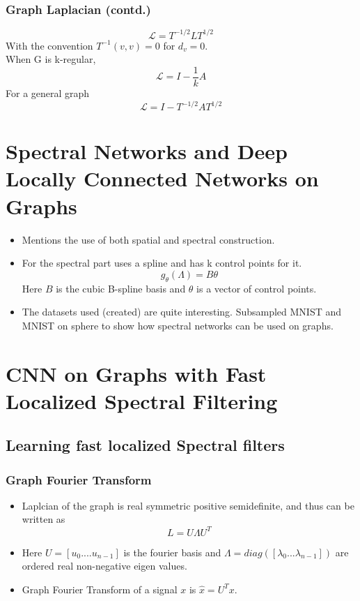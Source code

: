 \documentclass{beamer}
\begin{document}
\begin{frame}
  \frametitle{Graph Laplacian (contd.)}
  $$\mathcal{L} = T^{-1/2}LT^{1/2}$$
  With the convention $T^{-1}(v,v) = 0$ for $d_v = 0$.\\
  When G is k-regular,
  $$\mathcal{L} = I - \frac{1}{k}A$$
  For a general graph
  $$\mathcal{L} = I - T^{-1/2}AT^{1/2}$$
\end{frame}
\section{Spectral Networks and Deep Locally Connected Networks on Graphs}
\begin{frame}
  \begin{itemize}
  \item Mentions the use of both spatial and spectral construction.
  \item For the spectral part uses a spline and has k control points for it.
    $$g_{\theta}(\Lambda) = B\theta$$
    Here $B$ is the cubic B-spline basis and $\theta$ is a vector of control points.
  \item The datasets used (created) are quite interesting. Subsampled MNIST and MNIST on sphere to show how spectral networks can be used on graphs.
  \end{itemize}
\end{frame}

\section{CNN on Graphs with Fast Localized Spectral Filtering}
\subsection{Learning fast localized Spectral filters}
\begin{frame}
  \frametitle{Graph Fourier Transform}
  \begin{itemize}
  \item Laplcian of the graph is real symmetric positive semidefinite, and thus can be written as
    $$L = U \Lambda U^{T}$$
  \item Here $U = [u_0 .... u_{n-1}]$ is the fourier basis and $\Lambda = diag([\lambda_0...\lambda_{n-1}])$ are ordered real non-negative eigen values.
  \item Graph Fourier Transform of a signal $x$ is $\hat{x} = U^{T}x$.
  \end{itemize}
\end{frame}
\end{document}

